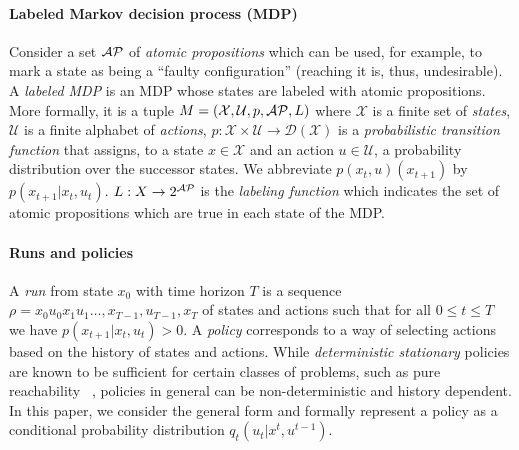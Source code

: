 \paragraph*{Labeled Markov decision process (MDP)} Consider a set $\mathcal{AP}$ of \emph{atomic propositions} which can be used, for example, to mark a state as being a ``faulty configuration'' (reaching it is, thus, undesirable). A \emph{labeled MDP} is an MDP whose states are labeled with atomic propositions. More formally, it is a tuple $M=(\mathcal{X},\mathcal{U},p,\mathcal{AP},L)$ where $\mathcal{X}$ is a
	finite set of \emph{states},
	$\mathcal{U}$ is a finite alphabet of \emph{actions},
	$p: \mathcal{X}\times\mathcal{U} \to \mathcal{D}({\mathcal{X}})$ is a \emph{probabilistic
	transition function} that assigns, to a state $x\in \mathcal{X}$ and an action $u \in
	\mathcal{U}$, a probability distribution over the successor states. We
	abbreviate $p(x_{t},u)(x_{t+1})$ by $p(x_{t+1}|x_t,u_t)$.
$L : X \rightarrow 2^{\mathcal{AP}}$ is the \emph{labeling function} which indicates the set of atomic propositions which are true in each state of the MDP.
\paragraph*{Runs and policies}
A \emph{run} from state $x_0$ with time horizon $T$ is a sequence $\rho = x_0 u_0 x_1 u_1 \dots ,x_{T-1},u_{T-1},x_{T}$ of states and actions such that for all $0 \leq t\leq T$ we have $p(x_{t+1}|x_t,u_t)>0$. 
%
A \emph{policy} corresponds to a way of selecting actions based on the history
of states and actions. While \emph{deterministic stationary} policies
are known to be sufficient for certain classes of problems, such as pure reachability ~\cite{puterman2014}, policies in general can be non-deterministic and history dependent. In this paper, we consider the general form and formally represent a policy as a conditional probability distribution $q_t(u_t|x^t,u^{t-1})$. 

